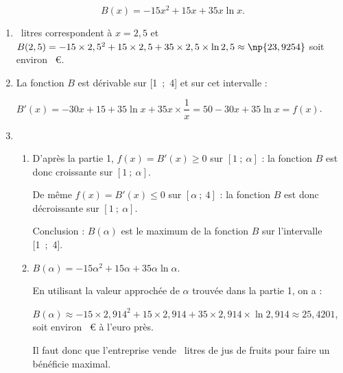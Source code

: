 \[B(x) = - 15x^2 + 15x +35x \ln x.\]

\begin{enumerate}
\item %

~litres correspondent à $x = 2,5$ et $B(2,5) = - 15 \times 2,5^2 + 15 \times 2,5 + 35 \times 2,5 \times \ln 2,5 \approx \np{23,9254}$ soit environ ~\euro.
\item %
La fonction $B$ est dérivable sur [1~;~4] et sur cet intervalle :

$B'(x) = - 30x + 15 + 35\ln x + 35x \times \dfrac{1}{x} = 50 - 30x + 35\ln x = f(x)$.
\item 
	\begin{enumerate}
		\item %
D'après la partie 1, $f(x) = B'(x) \geqslant  0$ sur $[1~;~\alpha]$ : la fonction $B$ est donc croissante sur $[1~;~\alpha]$.

De même $f(x) = B'(x) \leqslant  0$ sur $[\alpha~;~4]$ : la fonction $B$ est donc décroissante sur $[1~;~\alpha]$.

Conclusion : $B(\alpha)$ est le maximum de la fonction $B$ sur l'intervalle [1~;~4].
		\item %
$B(\alpha) = - 15\alpha^2 + 15\alpha + 35\alpha \ln \alpha$.

En utilisant la valeur approchée de $\alpha$ trouvée dans la partie 1, on a :

$B(\alpha) \approx - 15 \times 2,914^2 + 15 \times 2,914 + 35 \times 2,914 \times \ln 2,914 \approx 25,4201$, soit environ ~\euro{} à l'euro près.

Il faut donc que l'entreprise vende ~litres de jus de fruits pour faire un bénéficie maximal.
	\end{enumerate}
\end{enumerate}

